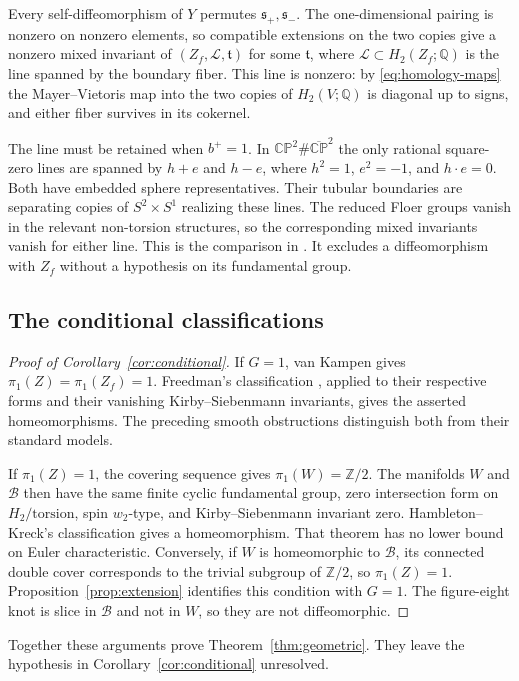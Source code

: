 \documentclass[11pt]{amsart}
\theoremstyle{definition}
\theoremstyle{remark}
\newcommand{\Z}{\mathbb Z}
\newcommand{\Q}{\mathbb Q}
\newcommand{\CP}{\mathbb{CP}}
\newcommand{\bCP}{\overline{\mathbb{CP}}}
\newcommand{\BK}{\mathcal B}
\begin{document}
Every self-diffeomorphism of $Y$ permutes $\mathfrak s_+,
\mathfrak s_-$. The one-dimensional pairing is nonzero on nonzero
elements, so compatible extensions on the two copies give a nonzero
mixed invariant of $(Z_f,\mathcal L,\mathfrak t)$ for some
$\mathfrak t$, where $\mathcal L\subset H_2(Z_f;\Q)$ is the
line spanned by the boundary fiber. This line is nonzero: by
\eqref{eq:homology-maps} the Mayer--Vietoris map into the two copies
of $H_2(V;\Q)$ is diagonal up to signs, and either fiber survives
in its cokernel.

The line must be retained when $b^+=1$. In
$\CP^2\#\bCP^2$ the only rational square-zero lines are spanned
by $h+e$ and $h-e$, where $h^2=1$, $e^2=-1$, and $h\cdot e=0$.
Both have embedded sphere representatives. Their tubular boundaries
are separating copies of $S^2\times S^1$ realizing these lines.
The reduced Floer groups vanish in the relevant non-torsion
structures, so the corresponding mixed invariants vanish for either
line. This is the comparison in \cite[proof of Theorem 2]{LP25}.
It excludes a diffeomorphism with $Z_f$ without a hypothesis on
its fundamental group.

\subsection{The conditional classifications}
\begin{proof}[Proof of Corollary~\ref{cor:conditional}]
If $G=1$, van Kampen gives $\pi_1(Z)=\pi_1(Z_f)=1$. Freedman's
classification \cite{Fre82}, applied to their respective forms and
their vanishing Kirby--Siebenmann invariants, gives the asserted
homeomorphisms. The preceding smooth obstructions distinguish both
from their standard models.

If $\pi_1(Z)=1$, the covering sequence gives $\pi_1(W)=\Z/2$.
The manifolds $W$ and $\BK$ then have the same finite cyclic
fundamental group, zero intersection form on $H_2/\mathrm{torsion}$,
spin $w_2$-type, and Kirby--Siebenmann invariant zero.
Hambleton--Kreck's classification \cite[Theorem C]{HK93} gives
a homeomorphism. That theorem has no lower bound on Euler
characteristic. Conversely, if $W$ is homeomorphic to $\BK$,
its connected double cover corresponds to the trivial subgroup
of $\Z/2$, so $\pi_1(Z)=1$. Proposition~\ref{prop:extension}
identifies this condition with $G=1$. The figure-eight knot is
slice in $\BK$ and not in $W$, so they are not diffeomorphic.
\end{proof}

Together these arguments prove Theorem~\ref{thm:geometric}.
They leave the hypothesis in Corollary~\ref{cor:conditional}
unresolved.
\end{document}
